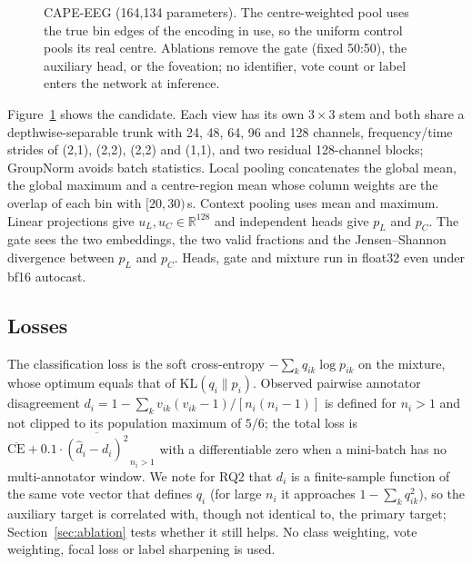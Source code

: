 \documentclass[sigconf,anonymous]{acmart}
\newcommand{\kl}{\mathrm{KL}}
\begin{document}
\begin{figure}[t]
\caption{CAPE-EEG (164,134 parameters). The centre-weighted pool uses the true bin edges of the encoding in use, so the uniform control pools its real centre. Ablations remove the gate (fixed 50:50), the auxiliary head, or the foveation; no identifier, vote count or label enters the network at inference.}
\label{fig:arch}
\end{figure}

Figure~\ref{fig:arch} shows the candidate. Each view has its own $3\times 3$ stem and both share a depthwise-separable trunk with 24, 48, 64, 96 and 128 channels, frequency/time strides of (2,1), (2,2), (2,2) and (1,1), and two residual 128-channel blocks; GroupNorm avoids batch statistics. Local pooling concatenates the global mean, the global maximum and a centre-region mean whose column weights are the overlap of each bin with $[20,30)$\,s. Context pooling uses mean and maximum. Linear projections give $u_L,u_C\in\mathbb{R}^{128}$ and independent heads give $p_L$ and $p_C$. The gate sees the two embeddings, the two valid fractions and the Jensen--Shannon divergence between $p_L$ and $p_C$. Heads, gate and mixture run in float32 even under bf16 autocast.

\subsection{Losses}
The classification loss is the soft cross-entropy $-\sum_k q_{ik}\log p_{ik}$ on the mixture, whose optimum equals that of $\kl(q_i\|p_i)$. Observed pairwise annotator disagreement $d_i=1-\sum_k v_{ik}(v_{ik}-1)/[n_i(n_i-1)]$ is defined for $n_i>1$ and not clipped to its population maximum of $5/6$; the total loss is $\overline{\mathrm{CE}}+0.1\cdot\overline{(\hat d_i-d_i)^2}_{\,n_i>1}$ with a differentiable zero when a mini-batch has no multi-annotator window. We note for RQ2 that $d_i$ is a finite-sample function of the same vote vector that defines $q_i$ (for large $n_i$ it approaches $1-\sum_k q_{ik}^2$), so the auxiliary target is correlated with, though not identical to, the primary target; Section~\ref{sec:ablation} tests whether it still helps. No class weighting, vote weighting, focal loss or label sharpening is used.
\end{document}
